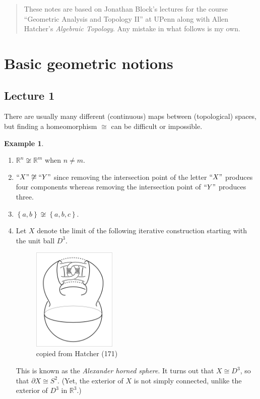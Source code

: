 \documentclass[10pt,letterpaper,cm]{nupset}
\theoremstyle{definition}
\newtheorem{exmp}[definition]{Example}
\theoremstyle{theorem}
\theoremstyle{remark}
\newcommand{\R}{\mathbb{R}}
\newcommand{\1}{\mathbb{1}}
\newcommand{\0}{\vec 0}
\begin{document}
\thispagestyle{empty}
\begin{abstract}
These notes are based on Jonathan Block's lectures for the course ``Geometric Analysis and Topology II'' at UPenn along with Allen Hatcher's \textit{Algebraic Topology}. Any mistake in what follows is my own.
\end{abstract}

\tableofcontents
\newpage

\section{Basic geometric notions} 

\subsection{Lecture 1}

 There are usually many different (continuous) maps between (topological) spaces, but finding a homeomorphism $\cong$ can be difficult or impossible.
 \begin{exmp} $ $
\begin{enumerate}
\item $\R^n \not \cong \R^m$ when $n \ne m$.
\item $``X" \not \cong ``Y"$ since removing the intersection point of the letter $``X" $ produces four components whereas removing the intersection point of $``Y"$ produces three.
\item $\left\{a, b\right\} \not \cong \left\{a,b, c\right\}$.
\item Let $X$ denote the limit of the following iterative construction starting with the unit ball $D^3$. 
\begin{figure}[H]
\centering
\includegraphics[width=40mm]{Hatcher-HornedSphere.png}
\caption{copied from Hatcher (171) \label{overflow}}
\end{figure}
This is known as the \textit{Alexander horned sphere}. It turns out that $X \cong D^3$, so that $\partial{X} \cong S^2$. (Yet, the exterior of $X$ is not simply connected, unlike the exterior of $D^3$ in $\R^3$.)
\end{enumerate}
\end{exmp}
\end{document}
